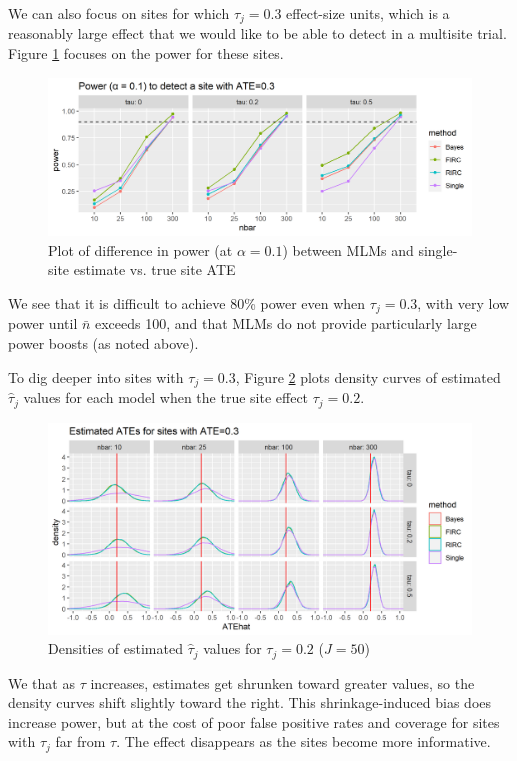 \documentclass[]{article}
\begin{document}
We can also focus on sites for which $\tau_j = 0.3$ effect-size units, which is a reasonably large effect that we would like to be able to detect in a multisite trial.
Figure \ref{fig:power_plot_ATE03} focuses on the power for these sites.
\begin{figure}[ht]
	\centering
	\includegraphics[width=\textwidth]{power_plot_ATE03}
	\caption{Plot of difference in power (at $\alpha = 0.1$) between MLMs and single-site estimate vs. true site ATE}
	\label{fig:power_plot_ATE03}
\end{figure}
We see that it is difficult to achieve 80\% power even when $\tau_j = 0.3$, with very low power until $\bar{n}$ exceeds 100, and that MLMs do not provide particularly large power boosts (as noted above).

To dig deeper into sites with $\tau_j = 0.3$, Figure \ref{fig:power_plot_ATE03_dens} plots density curves of estimated $\hat{\tau}_j$ values for each model when the true site effect $\tau_j = 0.2$.

\begin{figure}[ht]
	\centering
	\includegraphics[width=\textwidth]{power_plot_ATE03_dens}
	\caption{Densities of estimated $\hat{\tau}_j$ values for $\tau_j = 0.2$ ($J = 50$)}
	\label{fig:power_plot_ATE03_dens}
\end{figure}

We that as $\tau$ increases, estimates get shrunken toward greater values, so the density curves shift slightly toward the right.
This shrinkage-induced bias does increase power, but at the cost of poor false positive rates and coverage for sites with $\tau_j$ far from $\tau$.
The effect disappears as the sites become more informative.
\end{document}
